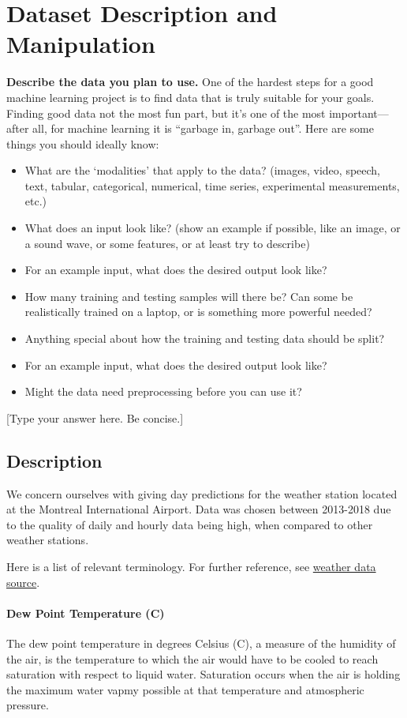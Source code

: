 \documentclass[a4paper,11pt]{article}
\begin{document}
\section{Dataset Description and Manipulation}
\textbf{Describe the data you plan to use.} One of the hardest steps for a good machine learning project is to find data that is truly suitable for your goals. Finding good data not the most fun part, but it’s one of the most important—after all, for machine learning it is “garbage in, garbage out”. Here are some things you should ideally know:
\begin{itemize}
  \item What are the ‘modalities’ that apply to the data? (images, video, speech, text, tabular, categorical, numerical, time series, experimental measurements, etc.)
  \item What does an input look like? (show an example if possible, like an image, or a sound wave, or some features, or at least try to describe)
  \item  For an example input, what does the desired output look like?
  \item   How many training and testing samples will there be? Can some be realistically trained on a laptop, or is something more powerful needed?
  \item  Anything special about how the training and testing data should be split?
  \item  For an example input, what does the desired output look like?
  \item  Might the data need preprocessing before you can use it?
\end{itemize}
[Type your answer here. Be concise.]

\subsection{Description}
We concern ourselves with giving day predictions for the weather station located at the Montreal International Airport. Data was chosen between 2013-2018 due to the quality of daily and hourly data being high, when compared to other weather stations. \par

Here is a list of relevant terminology. For further reference, see \href{https://climate.weather.gc.ca/historical_data/search_historic_data_e.html}{weather data source}.

\paragraph{Dew Point Temperature (C)}
The dew point temperature in degrees Celsius (C), a measure of the humidity of the air, is the temperature to which the air would have to be cooled to reach saturation with respect to liquid water. Saturation occurs when the air is holding the maximum water vapmy possible at that temperature and atmospheric pressure.
\end{document}
